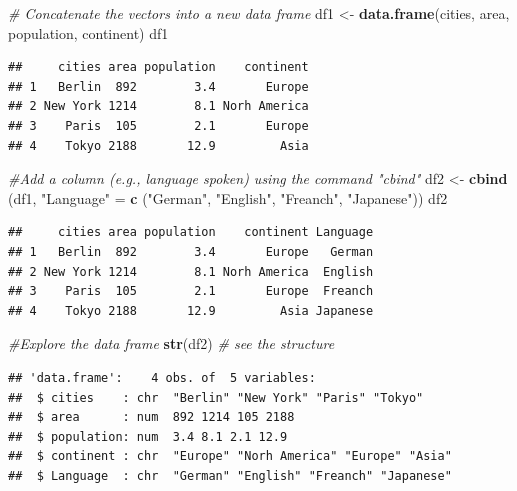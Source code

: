 \documentclass[
]{book}
\newenvironment{Shaded}{\begin{snugshade}}{\end{snugshade}}
\newcommand{\CommentTok}[1]{\textcolor[rgb]{0.56,0.35,0.01}{\textit{#1}}}
\newcommand{\FunctionTok}[1]{\textcolor[rgb]{0.13,0.29,0.53}{\textbf{#1}}}
\newcommand{\NormalTok}[1]{#1}
\newcommand{\OtherTok}[1]{\textcolor[rgb]{0.56,0.35,0.01}{#1}}
\newcommand{\StringTok}[1]{\textcolor[rgb]{0.31,0.60,0.02}{#1}}
\begin{document}
\begin{Shaded}
\begin{Highlighting}[]
\CommentTok{\# Concatenate the vectors into a new data frame}
\NormalTok{df1 }\OtherTok{\textless{}{-}} \FunctionTok{data.frame}\NormalTok{(cities, area, population, continent)}
\NormalTok{df1}
\end{Highlighting}
\end{Shaded}

\begin{verbatim}
##     cities area population    continent
## 1   Berlin  892        3.4       Europe
## 2 New York 1214        8.1 Norh America
## 3    Paris  105        2.1       Europe
## 4    Tokyo 2188       12.9         Asia
\end{verbatim}

\begin{Shaded}
\begin{Highlighting}[]
\CommentTok{\#Add a column (e.g., language spoken) using the command "cbind"}
\NormalTok{df2 }\OtherTok{\textless{}{-}} \FunctionTok{cbind}\NormalTok{ (df1, }\StringTok{"Language"} \OtherTok{=} \FunctionTok{c}\NormalTok{ (}\StringTok{"German"}\NormalTok{, }\StringTok{"English"}\NormalTok{, }\StringTok{"Freanch"}\NormalTok{, }\StringTok{"Japanese"}\NormalTok{))}
\NormalTok{df2}
\end{Highlighting}
\end{Shaded}

\begin{verbatim}
##     cities area population    continent Language
## 1   Berlin  892        3.4       Europe   German
## 2 New York 1214        8.1 Norh America  English
## 3    Paris  105        2.1       Europe  Freanch
## 4    Tokyo 2188       12.9         Asia Japanese
\end{verbatim}

\begin{Shaded}
\begin{Highlighting}[]
\CommentTok{\#Explore the data frame}
\FunctionTok{str}\NormalTok{(df2) }\CommentTok{\# see the structure}
\end{Highlighting}
\end{Shaded}

\begin{verbatim}
## 'data.frame':    4 obs. of  5 variables:
##  $ cities    : chr  "Berlin" "New York" "Paris" "Tokyo"
##  $ area      : num  892 1214 105 2188
##  $ population: num  3.4 8.1 2.1 12.9
##  $ continent : chr  "Europe" "Norh America" "Europe" "Asia"
##  $ Language  : chr  "German" "English" "Freanch" "Japanese"
\end{verbatim}
\end{document}
